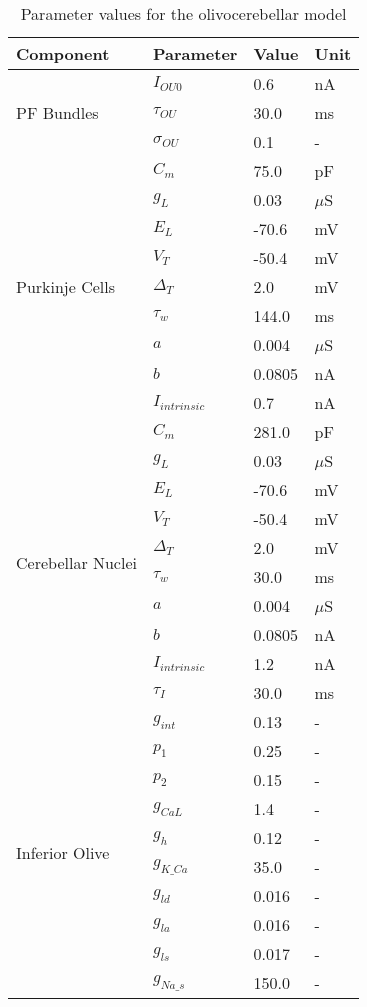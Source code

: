 \begin{table}[h]
\centering
\caption{Parameter values for the olivocerebellar model}
\label{tab:parameters}
\begin{tabular}{llll}
\hline
\textbf{Component} & \textbf{Parameter} & \textbf{Value} & \textbf{Unit} \\
\hline
\multirow{3}{*}{PF Bundles} & $I_{OU0}$ & 0.6 & nA \\
 & $\tau_{OU}$ & 30.0 & ms \\
 & $\sigma_{OU}$ & 0.1 & - \\
\hline
\multirow{9}{*}{Purkinje Cells} & $C_m$ & 75.0 & pF \\
 & $g_L$ & 0.03 & $\mu$S \\
 & $E_L$ & -70.6 & mV \\
 & $V_T$ & -50.4 & mV \\
 & $\Delta_T$ & 2.0 & mV \\
 & $\tau_w$ & 144.0 & ms \\
 & $a$ & 0.004 & $\mu$S \\
 & $b$ & 0.0805 & nA \\
 & $I_{intrinsic}$ & 0.7 & nA \\
\hline
\multirow{10}{*}{Cerebellar Nuclei} & $C_m$ & 281.0 & pF \\
 & $g_L$ & 0.03 & $\mu$S \\
 & $E_L$ & -70.6 & mV \\
 & $V_T$ & -50.4 & mV \\
 & $\Delta_T$ & 2.0 & mV \\
 & $\tau_w$ & 30.0 & ms \\
 & $a$ & 0.004 & $\mu$S \\
 & $b$ & 0.0805 & nA \\
 & $I_{intrinsic}$ & 1.2 & nA \\
 & $\tau_I$ & 30.0 & ms \\
\hline
\multirow{15}{*}{Inferior Olive} & $g_{int}$ & 0.13 & - \\
 & $p_1$ & 0.25 & - \\
 & $p_2$ & 0.15 & - \\
 & $g_{CaL}$ & 1.4 & - \\
 & $g_h$ & 0.12 & - \\
 & $g_{K\_Ca}$ & 35.0 & - \\
 & $g_{ld}$ & 0.016 & - \\
 & $g_{la}$ & 0.016 & - \\
 & $g_{ls}$ & 0.017 & - \\
 & $g_{Na\_s}$ & 150.0 & - \\

\end{tabular}
\end{table}
